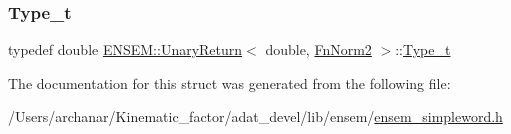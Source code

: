 \mbox{\label{structENSEM_1_1UnaryReturn_3_01double_00_01FnNorm2_01_4_aedc7475de7c195d2c7597fbf10405b87}} 
\subsubsection{\texorpdfstring{Type\_t}{Type\_t}\hspace{0.1cm}{\footnotesize\ttfamily [2/2]}}
{\footnotesize\ttfamily typedef double \mbox{\hyperlink{structENSEM_1_1UnaryReturn}{E\+N\+S\+E\+M\+::\+Unary\+Return}}$<$ double, \mbox{\hyperlink{structENSEM_1_1FnNorm2}{Fn\+Norm2}} $>$\+::\mbox{\hyperlink{structENSEM_1_1UnaryReturn_3_01double_00_01FnNorm2_01_4_aedc7475de7c195d2c7597fbf10405b87}{Type\+\_\+t}}}



The documentation for this struct was generated from the following file\+:\begin{DoxyCompactItemize}
\item 
/\+Users/archanar/\+Kinematic\+\_\+factor/adat\+\_\+devel/lib/ensem/\mbox{\hyperlink{lib_2ensem_2ensem__simpleword_8h}{ensem\+\_\+simpleword.\+h}}\end{DoxyCompactItemize}
